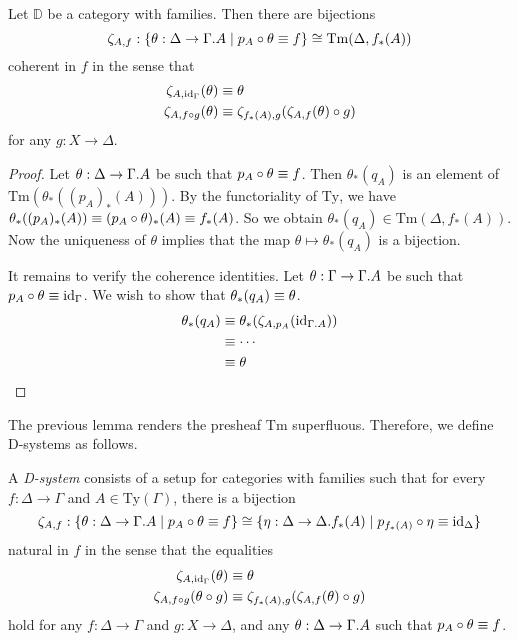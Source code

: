 \begin{lem}\label{lem:cwf_to_dsys}
Let $\mathbb{D}$ be a category with families. Then there are bijections
\begin{equation*}
\zeta_{A,f}:\{\theta:\Delta\to\ctxext{\Gamma}{A}\mid p_A\circ\theta\jdeq f\}\cong \mathrm{Tm}(\Delta,f_\ast(A))
\end{equation*}
coherent in $f$ in the sense that
\begin{align*}
\zeta_{A,{\mathrm{id}_{\Gamma}}}(\theta) & \equiv \theta \\
\zeta_{A,f\circ g}(\theta) & \equiv \zeta_{f_\ast(A),g}(\zeta_{A,f}(\theta)\circ g)
\end{align*}
for any $g:X\to\Delta$. 
\end{lem}

\begin{proof}
Let $\theta:\Delta\to\ctxext{\Gamma}{A}$ be such that $p_A\circ\theta\equiv f$. 
Then $\theta_\ast(q_A)$ is an element
of $\mathrm{Tm}(\theta_\ast((p_A)_\ast(A)))$. By the functoriality of $\mathrm{Ty}$, we have
$\theta_\ast((p_A)_\ast(A))\equiv (p_A\circ\theta)_\ast(A)\equiv f_\ast(A)$. 
So we obtain $\theta_\ast(q_A)\in\mathrm{Tm}(\Delta,f_\ast(A))$. Now
the uniqueness of $\theta$ implies that the map $\theta\mapsto \theta_\ast(q_A)$
is a bijection.

It remains to verify the coherence identities. Let $\theta : \Gamma\to\ctxext{\Gamma}{A}$
be such that $p_A\circ\theta\equiv{\mathrm{id}_{\Gamma}}$. We wish to show that
$\theta_\ast(q_A)\equiv\theta$.  
\begin{align*}
\theta_\ast(q_A)
& \jdeq \theta_\ast(\zeta_{A,p_A}(\catid{\ctxext{\Gamma}{A}})) \\
& \jdeq \cdots \\
& \jdeq \theta
\end{align*}
\end{proof}

The previous lemma renders the presheaf $\mathrm{Tm}$ superfluous. Therefore,
we define D-systems as follows.

\begin{defn}
A \emph{D-system} consists of a setup for categories with families
such that for every $f:\Delta\to\Gamma$ and $A\in\mathrm{Ty}(\Gamma)$, there
is a bijection
\begin{equation*}
\zeta_{A,f}:\{\theta:\Delta\to\ctxext{\Gamma}{A}\mid p_A\circ\theta\jdeq f\}
  \cong
\{\eta:\Delta\to\ctxext{\Delta}{f_\ast(A)}\mid p_{f_\ast(A)}\circ\eta\jdeq\catid{\Delta}\}
\end{equation*}
natural in $f$ in the sense that the equalities
\begin{align*}
\zeta_{A,{\mathrm{id}_{\Gamma}}}(\theta) & \equiv \theta \\
\zeta_{A,f\circ g}(\theta\circ g) & \equiv \zeta_{f_\ast(A),g}(\zeta_{A,f}(\theta)\circ g)
\end{align*}
hold for any $f:\Delta\to\Gamma$ and $g:X\to\Delta$, and any $\theta:\Delta\to\ctxext{\Gamma}{A}$
such that $p_A\circ\theta\equiv f$. 
\end{defn}

